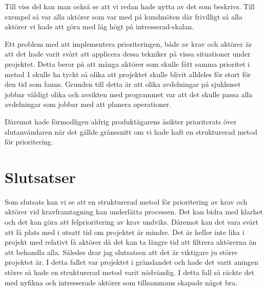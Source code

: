 Till viss del kan man också se att vi redan hade nytta av det som beskrivs. Till exempel så var alla aktörer som var med på kundmöten där frivilligt så alla aktörer vi hade att göra med låg högt på intresserad-skalan.

Ett problem med att implementera prioriteringen, både av krav och aktörer är att det hade varit svårt att applicera dessa tekniker på vissa situationer under projektet. Detta beror på att många aktörer som skulle fått samma prioritet i metod 1 skulle ha tyckt så olika att projektet skulle blivit alldeles för stort för den tid som fanns. Grunden till detta är att olika avdelningar på sjukhuset jobbar väldigt olika och avsikten med programmet var att det skulle passa alla avdelningar som jobbar med att planera operationer.

Däremot hade förmodligen aldrig produktägarens åsikter prioriterats över slutanvändaren när det gällde gränssnitt om vi hade haft en strukturerad metod för prioritering.


\section{Slutsatser}
Som slutsats kan vi se att en strukturerad metod för prioritering av krav och aktörer vid kravframtagning kan underlätta processen. Det kan bidra med klarhet och det kan göra att felprioritering av krav undviks. Däremot kan det vara svårt att få plats med i utsatt tid om projektet är mindre. Det är heller inte lika i projekt med relativt få aktörer då det kan ta längre tid att filtrera aktörerna än att behandla alla. Således drar jag slutsatsen att det är viktigare ju större projektet är. I detta fallet var projektet i gränslandet och hade det varit aningen större så hade en strukturerad metod varit nödvändig. I detta fall så räckte det med nyfikna och intresserade aktörer som tillsammans skapade något bra.
